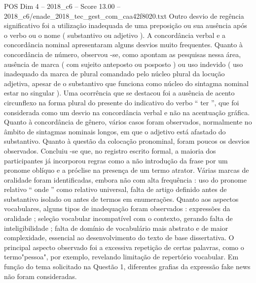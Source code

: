 \begin{textsample}{POS Dim 4 – 2018\_c6 – Score 13.00 – 2018\_c6/enade\_2018\_tec\_gest\_com\_caa42f8020.txt}
Outro desvio de regência significativo foi a utilização inadequada de uma preposição ou sua ausência após o verbo ou o nome ( substantivo ou adjetivo ).
A concordância verbal e a concordância nominal apresentaram alguns desvios muito frequentes.
Quanto à concordância de número, observou -se, como apontam as pesquisas nessa área, ausência de marca ( com sujeito anteposto ou posposto ) ou uso indevido ( uso inadequado da marca de plural comandado pelo núcleo plural da locução adjetiva, apesar de o substantivo que funciona como núcleo do sintagma nominal estar no singular ).
Uma ocorrência que se destacou foi a ausência de acento circunflexo na forma plural do presente do indicativo do verbo “ ter ”, que foi considerada como um desvio na concordância verbal e não na acentuação gráfica.
Quanto à concordância de gênero, vários casos foram observados, normalmente no âmbito de sintagmas nominais longos, em que o adjetivo está afastado do substantivo.
Quanto à questão da colocação pronominal, foram poucos os desvios observados.
Concluiu -se que, no registro escrito formal, a maioria dos participantes já incorporou regras como a não introdução da frase por um pronome oblíquo e a próclise na presença de um termo atrator.
Várias marcas de oralidade foram identificadas, embora não com alta frequência : uso do pronome relativo “ onde ” como relativo universal, falta de artigo definido antes de substantivo isolado ou antes de termos em enumerações.
Quanto aos aspectos vocabulares, alguns tipos de inadequação foram observados : expressões da oralidade ; seleção vocabular incompatível com o contexto, gerando falta de inteligibilidade ; falta de domínio de vocabulário mais abstrato e de maior complexidade, essencial ao desenvolvimento do texto de base dissertativa.
O principal aspecto observado foi a excessiva repetição de certas palavras, como o termo"pessoa", por exemplo, revelando limitação de repertório vocabular.
Em função do tema solicitado na Questão 1, diferentes grafias da expressão fake news não foram consideradas.

\end{textsample}
